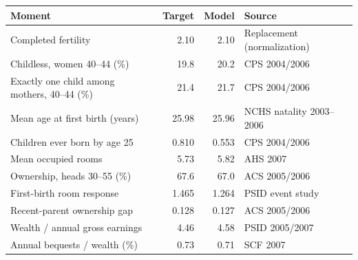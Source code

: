 \begin{tabularx}{\textwidth}{@{}Xrrl@{}}
\toprule
Moment & Target & Model & Source \\
\midrule
Completed fertility & 2.10 & 2.10 & Replacement (normalization) \\
Childless, women 40--44 (\%) & 19.8 & 20.2 & CPS 2004/2006 \\
Exactly one child among mothers, 40--44 (\%) & 21.4 & 21.7 & CPS 2004/2006 \\
Mean age at first birth (years) & 25.98 & 25.96 & NCHS natality 2003--2006 \\
Children ever born by age 25 & 0.810 & 0.553 & CPS 2004/2006 \\
\addlinespace[4pt]
Mean occupied rooms & 5.73 & 5.82 & AHS 2007 \\
Ownership, heads 30--55 (\%) & 67.6 & 67.0 & ACS 2005/2006 \\
First-birth room response & 1.465 & 1.264 & PSID event study \\
Recent-parent ownership gap & 0.128 & 0.127 & ACS 2005/2006 \\
\addlinespace[4pt]
Wealth / annual gross earnings & 4.46 & 4.58 & PSID 2005/2007 \\
Annual bequests / wealth (\%) & 0.73 & 0.71 & SCF 2007 \\
\bottomrule
\end{tabularx}
